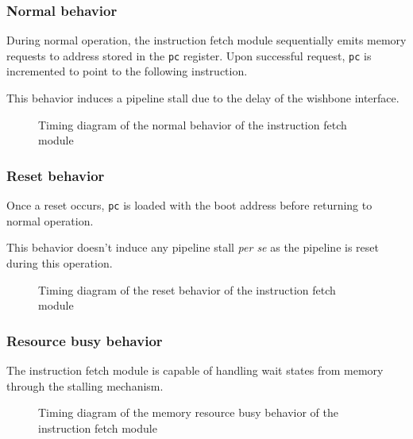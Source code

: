 \subsubsection{Normal behavior}

\begin{content}
  During normal operation, the instruction fetch module sequentially emits memory requests to address stored in the \texttt{pc} register. Upon successful request, \texttt{pc} is incremented to point to the following instruction.

  This behavior induces a pipeline stall due to the delay of the wishbone interface.
\end{content}

\begin{figure}[H]
    \centering
    
    \caption{Timing diagram of the normal behavior of the instruction fetch module}
    \label{fig:ifm-behavior-normal}
\end{figure}

\subsubsection{Reset behavior}

\begin{content}
  Once a reset occurs, \texttt{pc} is loaded with the boot address before returning to normal operation.

  This behavior doesn't induce any pipeline stall \textit{per se} as the pipeline is reset during this operation.
\end{content}

\begin{figure}[H]
    \centering
    
    \caption{Timing diagram of the reset behavior of the instruction fetch module}
    \label{fig:ifm-behavior-reset}
\end{figure}

\subsubsection{Resource busy behavior}

\begin{content}
  The instruction fetch module is capable of handling wait states from memory through the stalling mechanism.
\end{content}

\begin{figure}[H]
    \centering
    
    \caption{Timing diagram of the memory resource busy behavior of the instruction fetch module}
    \label{fig:ifm-behavior-wait}
\end{figure}

